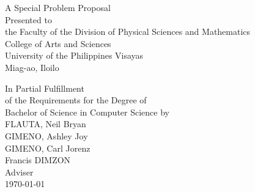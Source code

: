 \begin{titlepage}
\centering


\vspace{1.75cm}
A Special Problem Proposal\\
Presented to\\
the Faculty of the Division of Physical Sciences and Mathematics\\
College of Arts and Sciences\\
University of the Philippines Visayas\\
Miag-ao, Iloilo

\vspace{1.75cm}
In Partial Fulfillment\\
of the Requirements for the Degree of\\
Bachelor of Science in Computer Science
\vspace{1.75cm}
by\\

\vspace{1cm}
FLAUTA, Neil Bryan \\
GIMENO, Ashley Joy  \\
GIMENO, Carl Jorenz  \\

\vspace{1.75cm}
Francis DIMZON \\
Adviser\\

\vspace{1.75cm}
\today
\end{titlepage}
